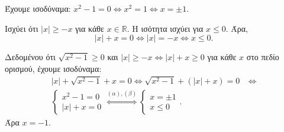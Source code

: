 
\begin{alist}
\item Έχουμε ισοδύναμα: $x^2 - 1 = 0 \Leftrightarrow x^2 = 1 \Leftrightarrow x = \pm 1$.

\item Ισχύει ότι $|x| \ge -x$ για κάθε $x \in \mathbb{R}$. Η ισότητα ισχύει για $x \le 0$. Άρα,
\[|x| + x = 0 \Leftrightarrow |x| = -x \Leftrightarrow x \le 0.\]

\item Δεδομένου ότι $\sqrt{x^2 - 1} \ge 0$ και $|x| \ge -x \Leftrightarrow |x| + x \ge 0$ για κάθε $x$ στο πεδίο ορισμού, έχουμε ισοδύναμα:
\begin{align*}
|x| + \sqrt{x^2 - 1} + x = 0 \Leftrightarrow \sqrt{x^2 - 1} + (|x| + x) = 0 \ &\Leftrightarrow \\
\begin{cases} x^2 - 1 = 0 \\ |x| + x = 0 \end{cases} \stackrel{(\alpha),(\beta)}{\Leftrightarrow} \begin{cases} x = \pm 1 \\ x \le 0 \end{cases}.
\end{align*}
Άρα $x = -1$.
\end{alist}

